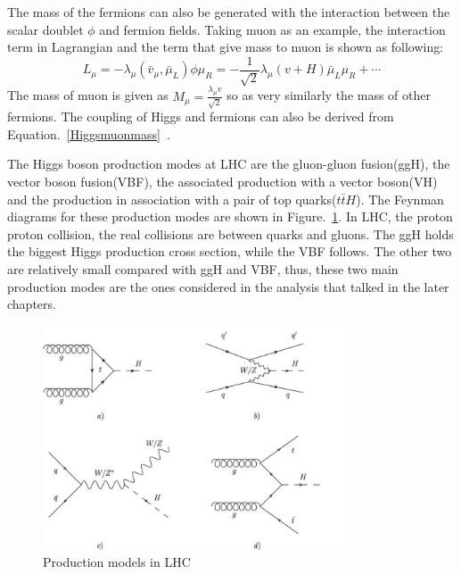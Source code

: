 The mass of the fermions can also be generated with the interaction between the scalar doublet $\phi$ and fermion fields. Taking muon as an example, the interaction term in Lagrangian and the term that give mass to muon is shown as following:
\begin{equation}\label{Higgsmuonmass}
L_{\mu}=-\lambda_{\mu}(\bar{v}_{\mu},\bar{\mu}_{L})\phi\mu_{R}
            =-\frac{1}{\sqrt{2}}\lambda_{\mu}(v+H)\bar{\mu}_{L}\mu_{R}+ \cdots
\end{equation}
The mass of muon is given as $M_{\mu}=\frac{\lambda_{\mu}v}{\sqrt{2}}$ so as very similarly the mass of other fermions. The coupling of Higgs and fermions can also be derived from Equation.~\ref{Higgsmuonmass}~\cite{DJOUADI20081}. 

The Higgs boson production modes at LHC are the gluon-gluon fusion(ggH), the vector boson fusion(VBF), the associated production with a vector boson(VH) and the production in association with a pair of top quarks($t\bar{t}H$). The Feynman diagrams for these production modes are shown in Figure.~\ref{fig:SM_H_production}. In LHC, the proton proton collision, the real collisions are between quarks and gluons. The ggH holds the biggest Higgs production cross section, while the VBF follows. The other two are relatively small compared with ggH and VBF, thus, these two main production modes are the ones considered in the analysis that talked in the later chapters.   
\begin{figure}[htbp] 
\centering
\includegraphics[width=0.8\textwidth]{chapter2/Higgs_production.jpg}
\caption{Production models in LHC}%
\label{fig:SM_H_production}
\end{figure}









